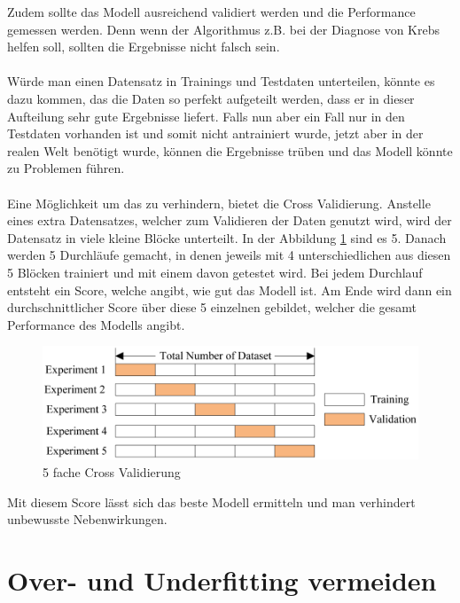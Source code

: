 \documentclass[12pt,oneside,a4paper,parskip]{scrbook}
\begin{document}
Zudem sollte das Modell ausreichend validiert werden und die Performance gemessen werden. Denn wenn der Algorithmus z.B. bei der Diagnose von Krebs helfen soll, sollten die Ergebnisse nicht falsch sein.
\\\\
Würde man einen Datensatz in Trainings und Testdaten unterteilen, könnte es dazu kommen, das die Daten so perfekt aufgeteilt werden, dass er in dieser Aufteilung sehr gute Ergebnisse liefert. Falls nun aber ein Fall nur in den Testdaten vorhanden ist und somit nicht antrainiert wurde, jetzt aber in der realen Welt benötigt wurde, können die Ergebnisse trüben und das Modell könnte zu Problemen führen.
\\\\
Eine Möglichkeit um das zu verhindern, bietet die Cross Validierung. Anstelle eines extra Datensatzes, welcher zum Validieren der Daten genutzt wird, wird der Datensatz in viele kleine Blöcke unterteilt. In der Abbildung \ref{fig:crossValidierung} sind es 5. Danach werden 5 Durchläufe gemacht, in denen jeweils mit 4 unterschiedlichen aus diesen 5 Blöcken trainiert und mit einem davon getestet wird. Bei jedem Durchlauf entsteht ein Score, welche angibt, wie gut das Modell ist. Am Ende wird dann ein durchschnittlicher Score über diese 5 einzelnen gebildet, welcher die gesamt Performance des Modells angibt.

\begin{figure}[h]
	\begin{center}
		\includegraphics[width=15cm]{Bilder/crossValidierung.png}
		\caption{5 fache Cross Validierung}
		\label{fig:crossValidierung}
	\end{center}
\end{figure}

Mit diesem Score lässt sich das beste Modell ermitteln und man verhindert unbewusste Nebenwirkungen.

\section{Over- und Underfitting vermeiden}
\label{section:preventData}
\end{document}
